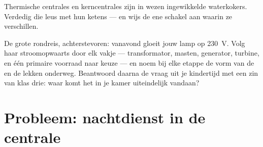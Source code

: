 \begin{exercise}[$\star\star$]\label{exo:g9:alternator:11}
Thermische centrales en kerncentrales zijn in wezen ingewikkelde
waterkokers. Verdedig die leus met hun ketens --- en wijs de ene schakel
aan waarin ze verschillen.
\end{exercise}

\begin{exercise}[$\star\star\star$]\label{exo:g9:alternator:12}
De grote rondreis, achterstevoren: vanavond gloeit jouw lamp op
\qty{230}{V}. Volg haar  stroomopwaarts door elk vakje ---
transformator, masten, generator, turbine, en één primaire voorraad
naar keuze --- en noem bij elke etappe de vorm van de
 en de lekken onderweg. Beantwoord daarna de vraag uit je
kindertijd met een zin van klas drie: waar komt het
 in je kamer uiteindelijk vandaan?
\end{exercise}

\section{Probleem: nachtdienst in de centrale}

